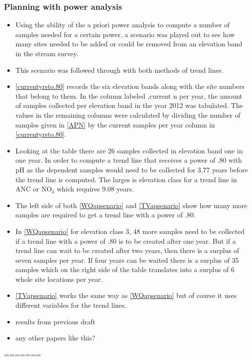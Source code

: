 \subsubsection{Planning with power analysis}
\begin{itemize}
	\item Using the ability of the a priori power analysis to compute a number of samples needed for a certain power, a scenario was played out to see how many sites needed to be added or could be removed from an elevation band in the stream survey.
	\item This scenario was followed through with both methods of trend lines.
	\item \autoref{currentyrsto.80} records the six elevation bands along with the site numbers that belong to them.  In the column labeled ,current n per year, the amount of samples collected per elevation band in the year 2012 was tabulated.  The values in the remaining columns were calculated by dividing the number of samples given in \autoref{APN} by the current samples per year column in \autoref{currentyrsto.80}.
	\item Looking at the table there are 26  samples collected in elevation band one in one year.  In order to compute a trend line that receives a power of .80 with pH as the dependent  samples would need to be collected for 3.77 years before the trend line is computed.   The larges is elevation class for a trend line in ANC or NO$_3$ which requires 9.08 years.
	
	\item The left side of both \autoref{WQapsenario} and \autoref{TVapsenario} show how many more samples are required to get a trend line with a power of .80. 
	\item  In \autoref{WQapsenario} for elevation class 3, 48 more samples need to be collected if a trend line with a power of .80 is to be created after one year.  But if a trend line can wait to be created after two years, then there is a surplus of seven samples per year.  If four years can be waited there is a surplus of 35 samples which on the right side of the table translates into a surplus of 6 whole site locations per year.
	\item \autoref{TVapsenario} works the same way as \autoref{WQapsenario} but of course it uses different variables for the trend lines.
	\item results from previous draft
	\item any other papers like this?
\end{itemize}
=======

